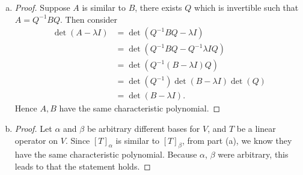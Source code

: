 \begin{Exercise}
	\begin{enumerate}[(a)]
		\item
		\begin{proof}
			Suppose $A$ is similar to $B$, there exists $Q$ which is invertible such that $A = Q^{-1} B Q$. Then consider
			\begin{align*}
			\det(A-\lambda I)
			&= \det(Q^{-1} B Q -\lambda I) \\
			&= \det(Q^{-1} B Q - Q^{-1} \lambda I Q ) \\
			&= \det(Q^{-1} (B-\lambda I) Q ) \\
			&= \det(Q^{-1})\det(B-\lambda I)\det(Q) \\
			&= \det(B-\lambda I).
			\end{align*}
			Hence $A,B$ have the same characteristic polynomial.
		\end{proof}
		
		\item
		\begin{proof}
			Let $\alpha$ and $\beta$ be arbitrary different bases for $V$, and $T$ be a linear operator on $V$. Since $[T]_{\alpha}$ is similar to $[T]_{\beta}$, from part (a), we know they have the same characteristic polynomial. Because $\alpha$, $\beta$ were arbitrary, this leads to that the statement holds.
		\end{proof}
	\end{enumerate}
\end{Exercise}